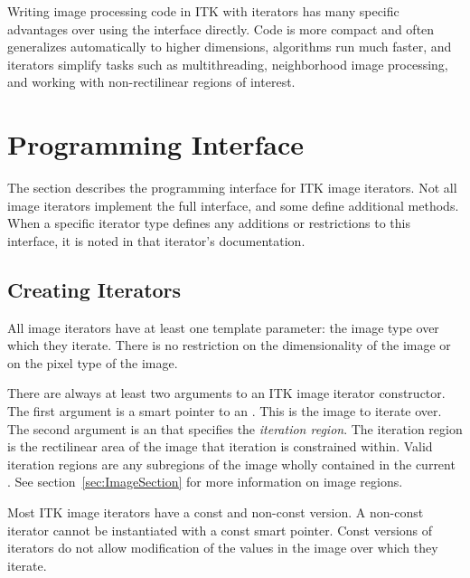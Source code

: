 Writing image processing code in ITK with iterators has many specific
advantages over using the  interface directly.  Code is more
compact and often generalizes automatically to higher dimensions, algorithms
run much faster, and iterators simplify tasks such as multithreading,
neighborhood image processing, and working with non-rectilinear regions of
interest.


\section{Programming Interface}
\label{sec:IteratorsInterface}

The section describes the programming interface for ITK image iterators.  Not
all image iterators implement the full interface, and some define additional
methods.  When a specific iterator type defines any additions or restrictions to this
interface, it is noted in that iterator's documentation.

\subsection{Creating Iterators}
\label{sec:CreatingIterators}

All image iterators have at least one template parameter: the image type over
which they iterate.  There is no restriction on the dimensionality of the image
or on the pixel type of the image.


There are always at least two arguments to an ITK image iterator constructor.
The first argument is a smart pointer to an .  This is the
image to iterate over. The second argument is an
 that specifies the \emph{iteration region}.  The
iteration region is the rectilinear area of the image that iteration is
constrained within. Valid iteration regions are any subregions of the image
wholly contained in the current .  See
section~\ref{sec:ImageSection} for more information on image regions. 


Most ITK image iterators have a const and non-const version.  A non-const
iterator cannot be instantiated with a const  smart pointer.
Const versions of iterators do not allow modification of the values in the
image over which they iterate.

